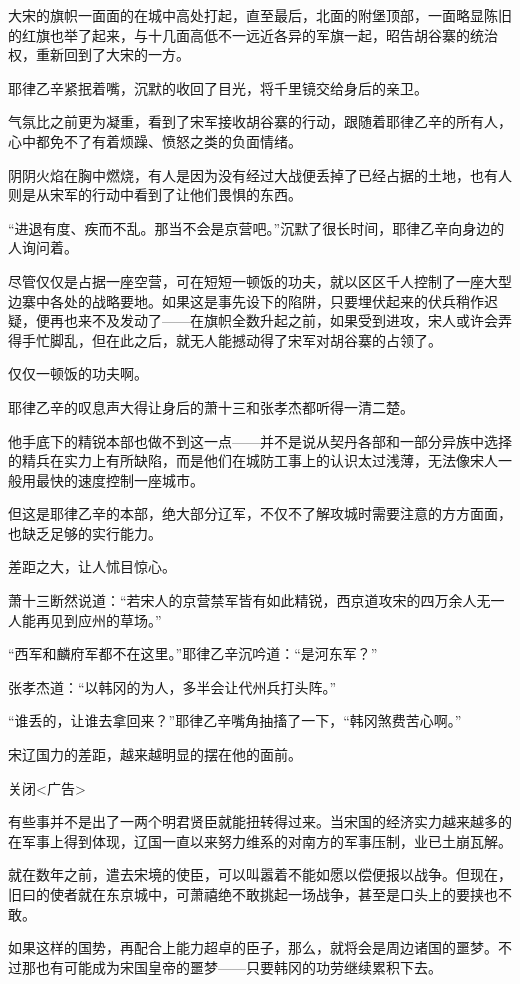 大宋的旗帜一面面的在城中高处打起，直至最后，北面的附堡顶部，一面略显陈旧的红旗也举了起来，与十几面高低不一远近各异的军旗一起，昭告胡谷寨的统治权，重新回到了大宋的一方。

耶律乙辛紧抿着嘴，沉默的收回了目光，将千里镜交给身后的亲卫。

气氛比之前更为凝重，看到了宋军接收胡谷寨的行动，跟随着耶律乙辛的所有人，心中都免不了有着烦躁、愤怒之类的负面情绪。

阴阴火焰在胸中燃烧，有人是因为没有经过大战便丢掉了已经占据的土地，也有人则是从宋军的行动中看到了让他们畏惧的东西。

“进退有度、疾而不乱。那当不会是京营吧。”沉默了很长时间，耶律乙辛向身边的人询问着。

尽管仅仅是占据一座空营，可在短短一顿饭的功夫，就以区区千人控制了一座大型边寨中各处的战略要地。如果这是事先设下的陷阱，只要埋伏起来的伏兵稍作迟疑，便再也来不及发动了——在旗帜全数升起之前，如果受到进攻，宋人或许会弄得手忙脚乱，但在此之后，就无人能撼动得了宋军对胡谷寨的占领了。

仅仅一顿饭的功夫啊。

耶律乙辛的叹息声大得让身后的萧十三和张孝杰都听得一清二楚。

他手底下的精锐本部也做不到这一点——并不是说从契丹各部和一部分异族中选择的精兵在实力上有所缺陷，而是他们在城防工事上的认识太过浅薄，无法像宋人一般用最快的速度控制一座城市。

但这是耶律乙辛的本部，绝大部分辽军，不仅不了解攻城时需要注意的方方面面，也缺乏足够的实行能力。

差距之大，让人怵目惊心。

萧十三断然说道：“若宋人的京营禁军皆有如此精锐，西京道攻宋的四万余人无一人能再见到应州的草场。”

“西军和麟府军都不在这里。”耶律乙辛沉吟道：“是河东军？”

张孝杰道：“以韩冈的为人，多半会让代州兵打头阵。”

“谁丢的，让谁去拿回来？”耶律乙辛嘴角抽搐了一下，“韩冈煞费苦心啊。”

宋辽国力的差距，越来越明显的摆在他的面前。

关闭<广告>

有些事并不是出了一两个明君贤臣就能扭转得过来。当宋国的经济实力越来越多的在军事上得到体现，辽国一直以来努力维系的对南方的军事压制，业已土崩瓦解。

就在数年之前，遣去宋境的使臣，可以叫嚣着不能如愿以偿便报以战争。但现在，旧曰的使者就在东京城中，可萧禧绝不敢挑起一场战争，甚至是口头上的要挟也不敢。

如果这样的国势，再配合上能力超卓的臣子，那么，就将会是周边诸国的噩梦。不过那也有可能成为宋国皇帝的噩梦——只要韩冈的功劳继续累积下去。

